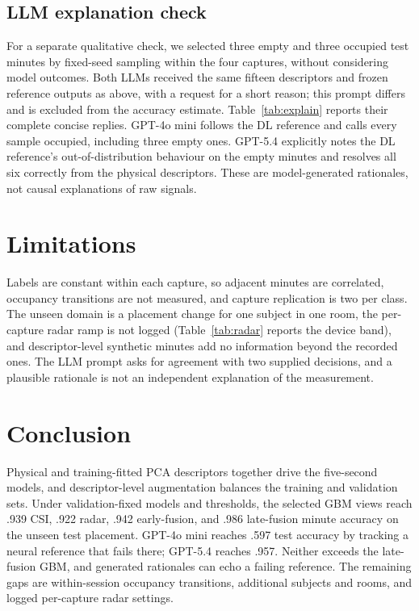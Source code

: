 \documentclass[conference,10pt,letterpaper]{IEEEtran}
\begin{document}
\subsection{LLM explanation check}
For a separate qualitative check, we selected three empty and three occupied test minutes by fixed-seed sampling within the four captures, without considering model outcomes. Both LLMs received the same fifteen descriptors and frozen reference outputs as above, with a request for a short reason; this prompt differs and is excluded from the accuracy estimate. Table~\ref{tab:explain} reports their complete concise replies. GPT-4o mini follows the DL reference and calls every sample occupied, including three empty ones. GPT-5.4 explicitly notes the DL reference's out-of-distribution behaviour on the empty minutes and resolves all six correctly from the physical descriptors. These are model-generated rationales, not causal explanations of raw signals.

\section{Limitations}
Labels are constant within each capture, so adjacent minutes are correlated, occupancy transitions are not measured, and capture replication is two per class. The unseen domain is a placement change for one subject in one room, the per-capture radar ramp is not logged (Table~\ref{tab:radar} reports the device band), and descriptor-level synthetic minutes add no information beyond the recorded ones. The LLM prompt asks for agreement with two supplied decisions, and a plausible rationale is not an independent explanation of the measurement.

\section{Conclusion}
Physical and training-fitted PCA descriptors together drive the five-second models, and descriptor-level augmentation balances the training and validation sets. Under validation-fixed models and thresholds, the selected GBM views reach .939 CSI, .922 radar, .942 early-fusion, and .986 late-fusion minute accuracy on the unseen test placement. GPT-4o mini reaches .597 test accuracy by tracking a neural reference that fails there; GPT-5.4 reaches .957. Neither exceeds the late-fusion GBM, and generated rationales can echo a failing reference. The remaining gaps are within-session occupancy transitions, additional subjects and rooms, and logged per-capture radar settings.
\end{document}
